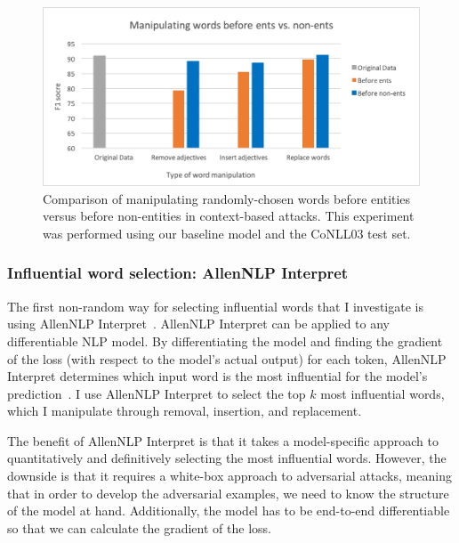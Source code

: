  \begin{figure}[h]
	\centering
	\includegraphics[width=0.85\linewidth]{LatexDiss/figures/manipentsvsnonents.png}
	\caption{Comparison of manipulating randomly-chosen words before entities versus before non-entities in context-based attacks. This experiment was performed using our baseline model and the CoNLL03 test set.}
	\label{fig:manipentsvsnonents}
\end{figure}
 
\subsubsection{Influential word selection: AllenNLP Interpret}
\label{allennlpinterpret}
The first non-random way for selecting influential words that I investigate is using AllenNLP Interpret~\citep{allennlpinterpret}. AllenNLP Interpret can be applied to any differentiable NLP model. By differentiating the model and finding the gradient of the loss (with respect to the model's actual output) for each token, AllenNLP Interpret determines which input word is the most influential for the model's prediction~\citep{allennlpinterpret}. I use AllenNLP Interpret to select the top $k$ most influential words, which I manipulate through removal, insertion, and replacement.

The benefit of AllenNLP Interpret is that it takes a model-specific approach to quantitatively and definitively selecting the most influential words. However, the downside is that it requires a white-box approach to adversarial attacks, meaning that in order to develop the adversarial examples, we need to know the structure of the model at hand. Additionally, the  model has to be end-to-end differentiable so that we can calculate the gradient of the loss.

